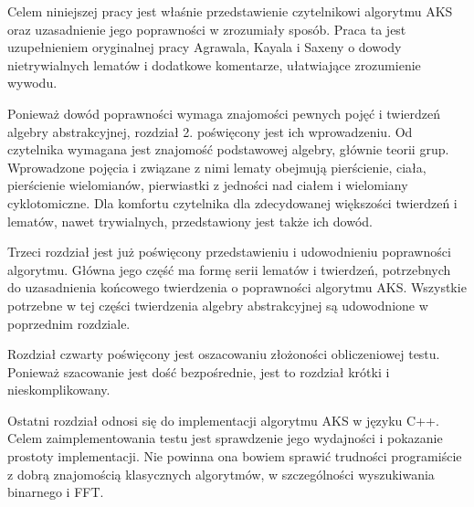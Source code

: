 \documentclass[polish,declaration,shortabstract]{iithesis}
\theoremstyle{definition}
\theoremstyle{remark} \newtheorem{observation}{Obserwacja}
\theoremstyle{plain} \newtheorem{theorem}{Twierdzenie}
\theoremstyle{plain} \newtheorem{lemma}{Lemat}
\theoremstyle{remark} \newtheorem*{remark*}{Uwaga}
\theoremstyle{reminder} \newtheorem*{reminder*}{Przypomnienie}
\begin{document}
Celem niniejszej pracy jest właśnie przedstawienie czytelnikowi algorytmu AKS oraz uzasadnienie jego poprawności w zrozumiały sposób. Praca ta jest uzupełnieniem oryginalnej pracy Agrawala, Kayala i Saxeny o dowody nietrywialnych lematów i dodatkowe komentarze, ułatwiające zrozumienie wywodu.

Ponieważ dowód poprawności wymaga znajomości pewnych pojęć i twierdzeń algebry abstrakcyjnej, rozdział 2. poświęcony jest ich wprowadzeniu. Od czytelnika wymagana jest znajomość podstawowej algebry, głównie teorii grup. Wprowadzone pojęcia i związane z nimi lematy obejmują pierścienie, ciała, pierścienie wielomianów, pierwiastki z jedności nad ciałem i wielomiany cyklotomiczne. Dla komfortu czytelnika dla zdecydowanej większości twierdzeń i lematów, nawet trywialnych, przedstawiony jest także ich dowód.

Trzeci rozdział jest już poświęcony przedstawieniu i udowodnieniu poprawności algorytmu. Główna jego część ma formę serii lematów i twierdzeń, potrzebnych do uzasadnienia końcowego twierdzenia o poprawności algorytmu AKS. Wszystkie potrzebne w tej części twierdzenia algebry abstrakcyjnej są udowodnione w poprzednim rozdziale.

Rozdział czwarty poświęcony jest oszacowaniu złożoności obliczeniowej testu. Ponieważ szacowanie jest dość bezpośrednie, jest to rozdział krótki i nieskomplikowany.

Ostatni rozdział odnosi się do implementacji algorytmu AKS w języku C++. Celem zaimplementowania testu jest sprawdzenie jego wydajności i pokazanie prostoty implementacji. Nie powinna ona bowiem sprawić trudności programiście z dobrą znajomością klasycznych algorytmów, w szczególności wyszukiwania binarnego i FFT.







\end{document}
